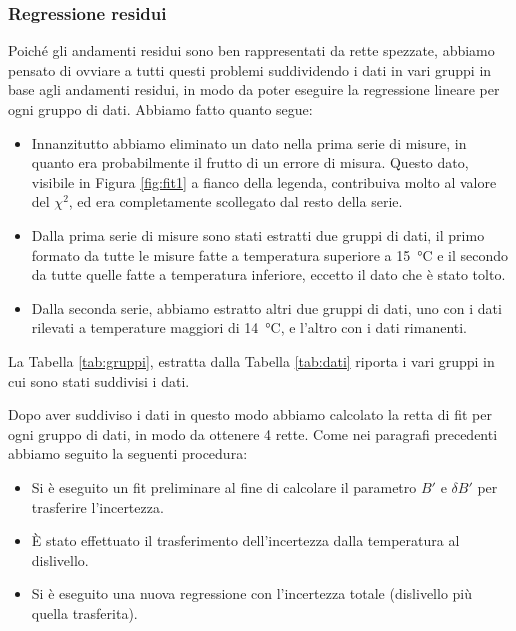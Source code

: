 \subsubsection{Regressione residui}

Poiché gli andamenti residui sono ben rappresentati da rette spezzate, abbiamo pensato di ovviare a tutti questi problemi suddividendo i
dati in vari gruppi in base agli andamenti residui, in modo da poter eseguire la regressione lineare per ogni gruppo di dati.
Abbiamo fatto quanto segue:

\label{sottoserie}
\begin{itemize}
    \item{Innanzitutto abbiamo eliminato un dato nella prima serie di misure, in quanto era probabilmente il frutto di un
        errore di misura. Questo dato, visibile in Figura \ref{fig:fit1} a fianco della legenda,
        contribuiva molto al valore del $\chi^2$, ed era completamente scollegato dal resto della serie.}
    \item{Dalla prima serie di misure sono stati estratti due gruppi di dati, il primo formato da tutte le misure fatte
        a temperatura superiore a \SI{15}{\celsius} e il secondo da tutte quelle fatte a temperatura inferiore, eccetto
        il dato che è stato tolto.}
    \item{Dalla seconda serie, abbiamo estratto altri due gruppi di dati, uno con i dati rilevati a temperature maggiori di
        \SI{14}{\celsius}, e l'altro con i dati rimanenti.}
\end{itemize}

La Tabella \ref{tab:gruppi}, estratta dalla Tabella \ref{tab:dati} riporta i vari gruppi in cui sono stati suddivisi i dati.

Dopo aver suddiviso i dati in questo modo abbiamo calcolato la retta di fit per ogni gruppo di dati, in modo da ottenere
4 rette. Come nei paragrafi precedenti abbiamo seguito la seguenti procedura:

\begin{itemize}
    \item{Si è eseguito un fit preliminare al fine di calcolare il parametro $B'$ e $\delta B'$ per trasferire l'incertezza.}
    \item{È stato effettuato il trasferimento dell'incertezza dalla temperatura al dislivello.}
    \item{Si è eseguito una nuova regressione con l'incertezza totale (dislivello più quella trasferita).}
\end{itemize}

